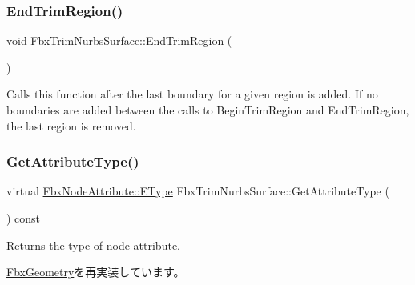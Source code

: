 \mbox{\label{class_fbx_trim_nurbs_surface_a3490479b6c5121b3755c06d7d604c4b9}} 
\subsubsection{\texorpdfstring{End\+Trim\+Region()}{EndTrimRegion()}}
{\footnotesize\ttfamily void Fbx\+Trim\+Nurbs\+Surface\+::\+End\+Trim\+Region (\begin{DoxyParamCaption}{ }\end{DoxyParamCaption})}

Calls this function after the last boundary for a given region is added. If no boundaries are added between the calls to Begin\+Trim\+Region and End\+Trim\+Region, the last region is removed. \mbox{\label{class_fbx_trim_nurbs_surface_a2d60f9613978db561ac32e2efff35104}} 
\subsubsection{\texorpdfstring{Get\+Attribute\+Type()}{GetAttributeType()}}
{\footnotesize\ttfamily virtual \hyperlink{class_fbx_node_attribute_a08e1669d3d1a696910756ab17de56d6a}{Fbx\+Node\+Attribute\+::\+E\+Type} Fbx\+Trim\+Nurbs\+Surface\+::\+Get\+Attribute\+Type (\begin{DoxyParamCaption}{ }\end{DoxyParamCaption}) const\hspace{0.3cm}{\ttfamily [virtual]}}



Returns the type of node attribute. 



\hyperlink{class_fbx_geometry_a41ae23e5d0cf08693bca49737f333de9}{Fbx\+Geometry}を再実装しています。

\mbox{\label{class_fbx_trim_nurbs_surface_af42e403f540581bee858f76fbd39f6b5}} 
